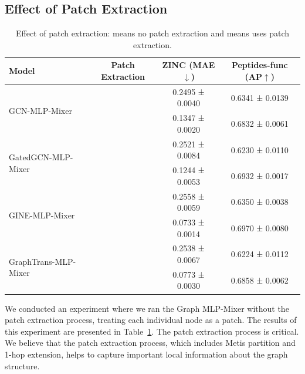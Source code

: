 \documentclass{article}
\newcommand{\cmark}{\ding{51}}%
\newcommand{\xmark}{\ding{55}}%
\begin{document}
\subsection{Effect of Patch Extraction}
\begin{table}[!ht]
    \caption{Effect of patch extraction: \xmark means no patch extraction and \cmark means uses patch extraction.
    \label{tab: patch extraction}}
    \centering
    \small
    \begin{tabular}{lccc}
    \toprule
         Model &  Patch Extraction & ZINC (MAE$\downarrow$) & Peptides-func (AP$\uparrow$)\\
        \midrule
         \multirow{2}{*}{GCN-MLP-Mixer}
         & \xmark & 0.2495 ± 0.0040 & 0.6341 ± 0.0139 \\
         & \cmark & 0.1347 ± 0.0020 & 0.6832 ± 0.0061 \\
         \midrule
         \multirow{2}{*}{GatedGCN-MLP-Mixer}
         & \xmark & 0.2521 ± 0.0084 & 0.6230 ± 0.0110\\
         & \cmark & 0.1244 ± 0.0053  & 0.6932 ± 0.0017\\
         \midrule
         \multirow{2}{*}{GINE-MLP-Mixer}
         & \xmark & 0.2558 ± 0.0059 & 0.6350 ± 0.0038\\
         & \cmark & 0.0733 ± 0.0014 & 0.6970 ± 0.0080\\
         \midrule
         \multirow{2}{*}{GraphTrans-MLP-Mixer}
         & \xmark & 0.2538 ± 0.0067 & 0.6224 ± 0.0112\\
         & \cmark & 0.0773 ± 0.0030 & 0.6858 ± 0.0062\\
         \bottomrule
    \end{tabular}
\end{table}
We conducted an experiment where we ran the Graph MLP-Mixer without the patch extraction process, treating each individual node as a patch. The results of this experiment are presented in Table~\ref{tab: patch extraction}. The patch extraction process is critical. We believe that the patch extraction process, which includes Metis partition and 1-hop extension, helps to capture important local information about the graph structure.
\end{document}
